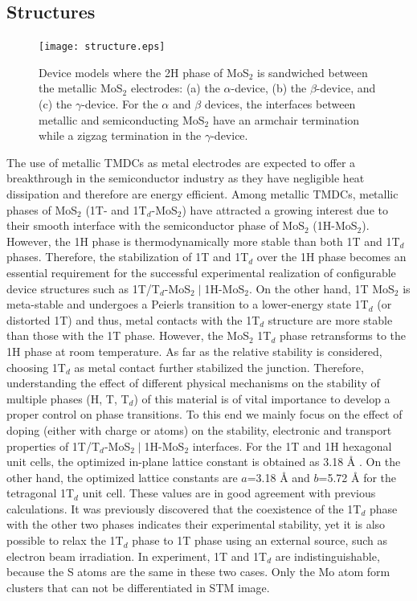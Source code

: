 \subsection{Structures}

\begin{figure}[htb]
\centering
\texttt{[image: structure.eps]}%
\caption{\label{structure-1t}  Device models where the 2H phase of MoS$_2$ is sandwiched between the metallic MoS$_2$ electrodes: (a) the $\alpha$-device, (b) the $\beta$-device, and (c)
the $\gamma$-device. For the $\alpha$ and $\beta$ devices, 
the interfaces between metallic and semiconducting MoS$_2$ have an armchair termination while a zigzag termination in the $\gamma$-device. }
\end{figure}

The use of metallic TMDCs as metal electrodes are expected to offer a breakthrough in the semiconductor industry as they have negligible heat dissipation and therefore are energy efficient. Among metallic TMDCs, metallic phases of MoS$_2$ (1T- and 1T$_d$-MoS$_2$) have attracted a growing interest due to their smooth interface with  the semiconductor phase of MoS$_2$ (1H-MoS$_2$). 
However, the 1H phase is thermodynamically more stable than both 1T and 1T$_d$ phases. Therefore, the stabilization of 1T and 1T$_d$  over the 1H phase becomes an essential requirement for the successful experimental realization of configurable device structures such as 1T/T$_d$-MoS$_{2}\mid$1H-MoS$_2$. On the other hand, 1T MoS$_2$ is meta-stable and undergoes a Peierls transition to a lower-energy state 1T$_d$ (or distorted 1T) and thus, metal contacts with the 1T$_d$ structure are more stable than those with the 1T phase. However, the MoS$_2$ 1T$_d$ phase retransforms to the 1H phase at room temperature. 
As far as the relative stability is considered, choosing 1T$_d$ as metal contact further stabilized the junction.
Therefore, understanding the effect of different physical mechanisms on the stability of multiple phases (H, T, T$_d$) of this material is of vital importance to develop a proper control on phase transitions. To this end we mainly focus on the effect of doping (either with charge or atoms) on the stability, electronic and transport properties of 1T/T$_d$-MoS$_2\mid$1H-MoS$_2$ interfaces.  For the 1T and 1H hexagonal unit cells, the optimized in-plane lattice constant is obtained as 3.18 {\AA} .  On the other hand, the optimized lattice constants are $a$=3.18 {\AA}  and  $b$=5.72 {\AA} for  the tetragonal 1T$_d$ unit cell. 
These values are in good agreement with previous calculations\cite{C5NR07715J}. It was previously discovered that the coexistence of the 1T$_d$ phase with the other two phases indicates their experimental stability, yet it is also possible to  relax the 1T$_d$ phase to 1T phase using an external source, such as electron beam irradiation\cite{Eda2012}. 
In experiment, 1T and 1T$_d$ are indistinguishable, because the S atoms are the same in these two cases. Only the Mo atom form clusters that can not be differentiated in STM image.

